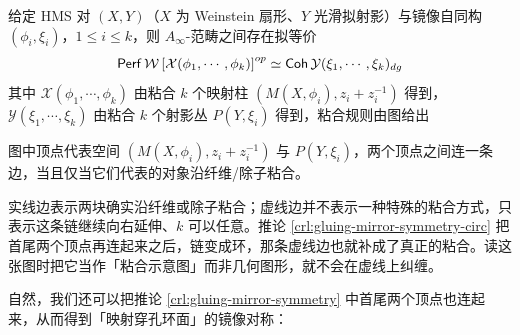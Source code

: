 \begin{crl}\label{crl:gluing-mirror-symmetry}
    给定 HMS 对 $(X,Y)$（$X$ 为 Weinstein 扇形、$Y$ 光滑拟射影）与镜像自同构 $(\phi_i,\xi_i)$，$1\leq i\leq k$，则 $A_{\infty}$-范畴之间存在拟等价 \[
        \operatorname{\mathsf{Perf}}\mathcal{W}\left[\mathcal{X} (\phi_1,\dotsb ,\phi_k)\right]^{op}\simeq\operatorname{\mathsf{Coh}}\mathcal{Y} (\xi_1,\dotsb ,\xi_k)_{dg}
    \]其中 $\mathcal{X} (\phi_1,\dotsb,\phi_k)$ 由粘合 $k$ 个映射柱 $\left(M(X,\phi_i),z_i+z_i^{-1}\right)$ 得到，$\mathcal{Y} (\xi_1,\dotsb ,\xi_k)$ 由粘合 $k$ 个射影丛 $P(Y,\xi_i)$ 得到，粘合规则由图给出\par
    \begin{center}
    \end{center}
    图中顶点代表空间 $\left(M(X,\phi_i),z_i+z_i^{-1}\right)$ 与 $P(Y,\xi_i)$，两个顶点之间连一条边，当且仅当它们代表的对象沿纤维/除子粘合。
\end{crl}

\begin{yizhu}
实线边表示两块确实沿纤维或除子粘合；虚线边并不表示一种特殊的粘合方式，只表示这条链继续向右延伸、$k$ 可以任意。推论 \ref{crl:gluing-mirror-symmetry-circ} 把首尾两个顶点再连起来之后，链变成环，那条虚线边也就补成了真正的粘合。读这张图时把它当作「粘合示意图」而非几何图形，就不会在虚线上纠缠。
\end{yizhu}

自然，我们还可以把推论 \ref{crl:gluing-mirror-symmetry} 中首尾两个顶点也连起来，从而得到「映射穿孔环面」的镜像对称：

